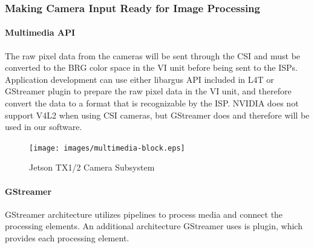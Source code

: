 \documentclass[letterpaper,10pt,serif,draftclsnofoot,onecolumn,compsoc,titlepage]{IEEEtran}
\begin{document}
\subsubsection{Making Camera Input Ready for Image Processing}

\paragraph{Multimedia API}

The raw pixel data from the cameras will be sent through the CSI and must be converted 
to the BRG color space in the VI unit before being sent to the ISPs. 
Application development can use either libargus API 
included in L4T or GStreamer plugin to prepare the raw pixel data in the VI unit, and 
therefore convert the data to a format that is recognizable by the ISP. NVIDIA does not 
support V4L2 when using CSI cameras, but GStreamer does and therefore will be used in 
our software.  \\

	\begin{figure}[H]
		\centering
		\label{fig:MultimediaBlockDiagram}
		\texttt{[image: images/multimedia-block.eps]}
		\caption{Jetson TX1/2 Camera Subsystem\cite{CSubDia} \label{overflow}}
	\end{figure}

\paragraph{GStreamer}

GStreamer architecture utilizes pipelines to process media and connect the processing 
elements. An additional architecture GStreamer uses is plugin, which provides each 
processing element. \\
\end{document}
